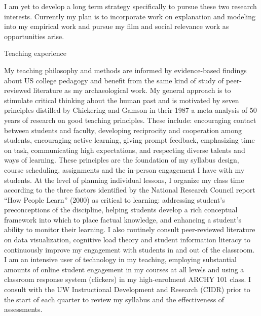 \documentclass[11pt,article,oneside]{memoir}
\begin{document}
I am yet to develop a long term strategy specifically to pursue these two research interests. Currently my plan is to incorporate work on explanation and modeling into my empirical work and pursue my film and social relevance work as opportunities arise. 

Teaching experience

My teaching philosophy and methods are informed by evidence-based findings about US college pedagogy and benefit from the same kind of study of peer-reviewed literature as my archaeological work. My general approach is to stimulate critical thinking about the human past and is motivated by seven principles distilled by Chickering and Gamson in their 1987 a meta-analysis of 50 years of research on good teaching principles. These include: encouraging contact between students and faculty, developing reciprocity and cooperation among students, encouraging active learning, giving prompt feedback, emphasizing time on task, communicating high expectations, and respecting diverse talents and ways of learning. These principles are the foundation of my syllabus design, course scheduling, assignments and the in-person engagement I have with my students. At the level of planning individual lessons, I organize my class time according to the three factors identified by the National Research Council report “How People Learn” (2000) as critical to learning: addressing student’s preconceptions of the discipline, helping students develop a rich conceptual framework into which to place factual knowledge, and enhancing a student’s ability to monitor their learning. I also routinely consult peer-reviewed literature on data visualization, cognitive load theory and student information literacy to continuously improve my engagement with students in and out of the classroom. I am an intensive user of technology in my teaching, employing substantial amounts of online student engagement in my courses at all levels and using a classroom response system (clickers) in my high-enrolment ARCHY 101 class. I consult with the UW Instructional Development and Research (CIDR) prior to the start of each quarter to review my syllabus and the effectiveness of assessments. 
\end{document}
